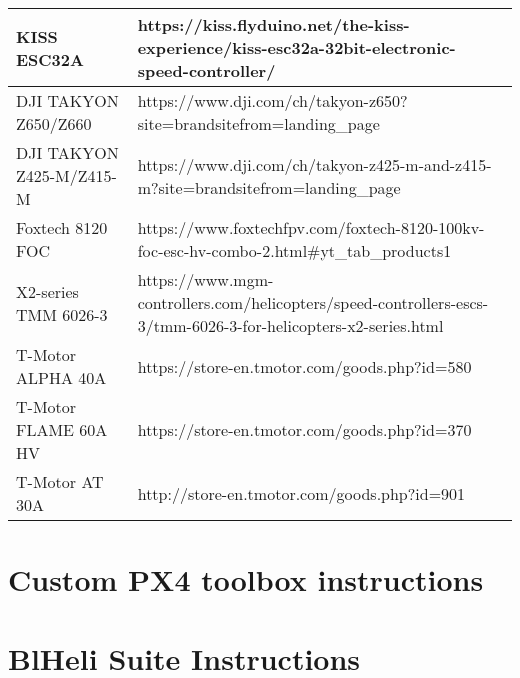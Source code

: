 \begin{table}
\begin{center}
{\begin{tabular}{lp{100mm}}
KISS ESC32A~                & https://kiss.flyduino.net/the-kiss-experience/kiss-esc32a-32bit-electronic-speed-controller/                                          \\ \hline
DJI TAKYON Z650/Z660        & https://www.dji.com/ch/takyon-z650?site=brandsitefrom=landing\_page                                                                   \\ \hline
DJI TAKYON Z425-M/Z415-M    & https://www.dji.com/ch/takyon-z425-m-and-z415-m?site=brandsitefrom=landing\_page                                                      \\ \hline
Foxtech 8120 FOC            & https://www.foxtechfpv.com/foxtech-8120-100kv-foc-esc-hv-combo-2.html\#yt\_tab\_products1                                             \\ \hline
X2-series TMM 6026-3        & https://www.mgm-controllers.com/helicopters/speed-controllers-escs-3/tmm-6026-3-for-helicopters-x2-series.html                        \\ \hline
T-Motor ALPHA 40A           & https://store-en.tmotor.com/goods.php?id=580                                                                                          \\ \hline
T-Motor FLAME 60A HV        & https://store-en.tmotor.com/goods.php?id=370                                                                                          \\ \hline
T-Motor AT 30A              & http://store-en.tmotor.com/goods.php?id=901                                                                                          
\end{tabular}
}
\end{center}
\end{table}


\chapter{Custom PX4 toolbox instructions}\label{sec:px4_instructions}



\chapter{BlHeli Suite Instructions} \label{sec:firm_blheli}